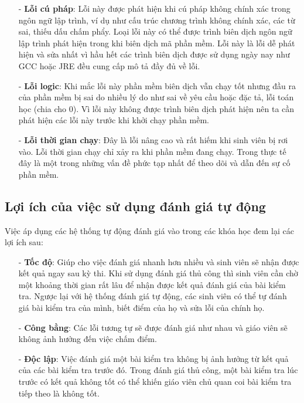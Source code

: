 \documentclass[12pt,a4paper]{article}
\begin{document}
\begin{itemize}
\item[-] \textbf{Lỗi cú pháp}: Lỗi này được phát hiện khi cú pháp không chính xác trong ngôn ngữ lập trình, ví dụ như cấu trúc chương trình không chính xác, các từ sai, thiếu dấu chấm phẩy. Loại lỗi này có thể được trình biên dịch ngôn ngữ lập trình phát hiện trong khi biên dịch mã phần mềm. Lỗi này là lỗi dễ phát hiện và sửa nhất vì hầu hết các trình biên dịch được sử dụng ngày nay như GCC hoặc JRE đều cung cấp mô tả đầy đủ về lỗi.
\item[-] \textbf{Lỗi logic}: Khi mắc lỗi này phần mềm biên dịch vẫn chạy tốt nhưng đầu ra của phần mềm bị sai do nhiều lý do như sai về yêu cầu hoặc đặc tả, lỗi toán học (chia cho 0). Vì lỗi này không được trình biên dịch phát hiện nên ta cần phát hiện các lỗi này trước khi khởi chạy phần mềm.
\item[-] \textbf{Lỗi thời gian chạy}: Đây là lỗi nâng cao và rất hiếm khi sinh viên bị rơi vào. Lỗi thời gian chạy chỉ xảy ra khi phần mềm đang chạy. Trong thực tế đây là một trong những vấn đề phức tạp nhất để theo dõi và dẫn đến sự cố phần mềm.
\end{itemize}
\subsection{Lợi ích của việc sử dụng đánh giá tự động}
Việc áp dụng các hệ thống tự động đánh giá vào trong các khóa học đem lại các lợi ích sau:

\begin{itemize}
\item[-] \textbf{Tốc độ}: Giúp cho việc đánh giá nhanh hơn nhiều và sinh viên sẽ nhận được kết quả ngay sau kỳ thi. Khi sử dụng đánh giá thủ công thì sinh viên cần chờ một khoảng thời gian rất lâu để nhận được kết quả đánh giá của bài kiểm tra. Ngược lại với hệ thống đánh giá tự động, các sinh viên có thể tự đánh giá bài kiểm tra của mình, biết điểm của họ và sửa lỗi của chính họ.
\item[-] \textbf{Công bằng}: Các lỗi tương tự sẽ được đánh giá như nhau và giáo viên sẽ không ảnh hưởng đến việc chấm điểm.
\item[-] \textbf{Độc lập}: Việc đánh giá một bài kiểm tra không bị ảnh hưởng từ kết quả của các bài kiểm tra trước đó. Trong đánh giá thủ công, một bài kiểm tra lúc trước có kết quả không tốt có thể khiến giáo viên chủ quan coi bài kiểm tra tiếp theo là không tốt.
\end{itemize}
\end{document}
